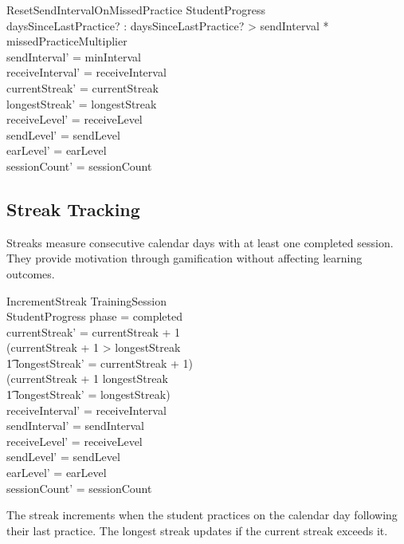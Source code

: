 \documentclass[a4paper,10pt,fleqn]{article}
\begin{document}
\begin{schema}{ResetSendIntervalOnMissedPractice}
\Delta StudentProgress \\
daysSinceLastPractice? : \nat
\where
daysSinceLastPractice? > sendInterval * missedPracticeMultiplier \\
sendInterval' = minInterval \\
receiveInterval' = receiveInterval \\
currentStreak' = currentStreak \\
longestStreak' = longestStreak \\
receiveLevel' = receiveLevel \\
sendLevel' = sendLevel \\
earLevel' = earLevel \\
sessionCount' = sessionCount
\end{schema}

\subsection{Streak Tracking}

Streaks measure consecutive calendar days with at least one completed session.
They provide motivation through gamification without affecting learning outcomes.

\begin{schema}{IncrementStreak}
  \Xi TrainingSession \\
  \Delta StudentProgress
  \where
  phase = completed \\
  currentStreak' = currentStreak + 1 \\
  (currentStreak + 1 > longestStreak \\
  \t1 \land longestStreak' = currentStreak + 1) \\
  \lor (currentStreak + 1 \leq longestStreak \\
  \t1 \land longestStreak' = longestStreak) \\
  receiveInterval' = receiveInterval \\
  sendInterval' = sendInterval \\
  receiveLevel' = receiveLevel \\
  sendLevel' = sendLevel \\
  earLevel' = earLevel \\
  sessionCount' = sessionCount
\end{schema}

The streak increments when the student practices on the calendar day following
their last practice. The longest streak updates if the current streak exceeds it.
\end{document}
